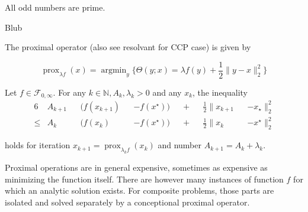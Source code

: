 \documentclass[varwidth=15cm, border=.5cm]{standalone}
\DeclareMathOperator{\prox}{prox}
\DeclareMathOperator*{\argmin}{argmin}
\begin{document}
\begin{theorem}[label=pb8y7i3e, name=Boundedness of operators]
	All odd numbers are prime. 

	\begin{theorem}
		Blub
	\end{theorem}
\end{theorem}

\begin{definition}[label=f6izn8iw, name=Proximal Operator]
	The proximal operator (also see resolvant for CCP case) is given by 

	\[
        \prox_{\lambda f}(x) = \argmin_y \{ \Theta(y; x) = \lambda f(y) +
        \frac{1}{2}\lVert y - x\rVert_2^2\}
	\]

    \begin{theorem}[label=78req5r7, name=Convergence with Lyapunov Analysis]
        Let \( f\in\mathcal{F}_{0,\infty} \). For any \( k\in\mathbb{N}, A_k, \lambda_k > 0\) and any \( x_k \), the inequality
        \begin{alignat*}{6}
            &A_{k+1}&&(f(x_{k+1}) &&- f(x^\star)) &&+ &&\frac{1}{2}\lVert x_{k+1} &&- x_\star\rVert^2_2  \\
            \leq &A_k&&(f(x_k)   &&- f(x^\star)) &&+ &&\frac{1}{2}\lVert x_k   &&- x^\star\rVert_2^2
        \end{alignat*}

        holds for iteration \( x_{k+1} = \prox_{\lambda_kf}(x_k) \) and number \(A_{k+1}= A_k + \lambda_k\).
    \end{theorem}

    \begin{remark}[label=hnns6j86, name=Computation complexity]
        Proximal operations are in general expensive, sometimes as expensive as
        minimizing the function itself. There are however many instances of
        function \( f \) for which an analytic solution exists. For composite
        problems, those parts are isolated and solved separately by a
        conceptional proximal operator.
    \end{remark}
\end{definition}
\end{document}
